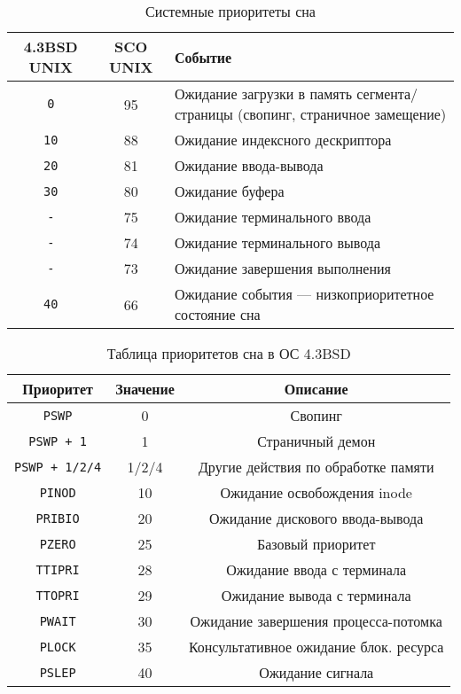 \begin{table}[h]
	\caption{Системные приоритеты сна}
	\label{tab:bsd_2}
	\begin{center}
		\begin{tabular}{ |c|c|p{9cm}|  }
			\hline
			\textbf{4.3BSD UNIX} & \textbf{SCO UNIX} & \textbf{Событие} \\
			\hline
			\texttt{0} & 95 & Ожидание загрузки в память сегмента/страницы (свопинг, страничное замещение) \\
			\hline
			\texttt{10} & 88 & Ожидание индексного дескриптора \\
			\hline
			\texttt{20} & 81 & Ожидание ввода-вывода \\
			\hline
			\texttt{30} & 80 & Ожидание буфера \\
			\hline
			\texttt{-} & 75 & Ожидание терминального ввода \\
			\hline
			\texttt{-} & 74 & Ожидание терминального вывода \\
			\hline
			\texttt{-} & 73 & Ожидание завершения выполнения \\
			\hline
			\texttt{40} & 66 & Ожидание события --- низкоприоритетное состояние сна \\
			\hline
		\end{tabular}
	\end{center}
\end{table}

\begin{table}[!h]
	\caption{Таблица приоритетов сна в ОС 4.3BSD}
	\label{tab:bsd}
	\begin{center}
		\begin{tabular}{ |c|c|c|  }
			\hline
			\textbf{Приоритет} & \textbf{Значение} & \textbf{Описание} \\
			\hline
			\texttt{PSWP} & 0 & Свопинг \\
			\hline
			\texttt{PSWP + 1} & 1 & Страничный демон \\
			\hline
			\texttt{PSWP + 1/2/4} & 1/2/4 & Другие действия по обработке памяти \\
			\hline
			\texttt{PINOD} & 10 & Ожидание освобождения inode \\
			\hline
			\texttt{PRIBIO} & 20 & Ожидание дискового ввода-вывода \\
			\hline
			\texttt{PZERO} & 25 & Базовый приоритет \\
			\hline
			\texttt{TTIPRI} & 28 & Ожидание ввода с терминала \\
			\hline
			\texttt{TTOPRI} & 29 & Ожидание вывода с терминала \\
			\hline 
			\texttt{PWAIT} & 30 & Ожидание завершения процесса-потомка \\
			\hline
			\texttt{PLOCK} & 35 & Консультативное ожидание блок.
			ресурса \\
			\hline
			\texttt{PSLEP} & 40 & Ожидание сигнала \\
			\hline
		\end{tabular}
	\end{center}
\end{table}

